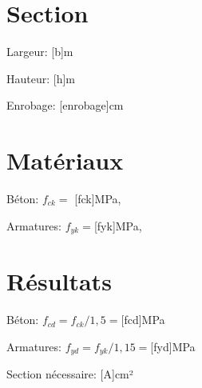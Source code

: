 


\section{Section}

Largeur: [{b}]m

Hauteur: [{h}]m

Enrobage: [{enrobage}]cm

\section{Matériaux}

Béton: $f_{ck} = $ [{fck}]MPa,

Armatures: $f_{yk} = $[{fyk}]MPa,

\section{Résultats}

Béton: $ f_{cd} = f_{ck}/ 1,5 = $[{fcd}]MPa

Armatures: $ f_{yd} = f_{yk}/ 1,15 = $[{fyd}]MPa

Section nécessaire: [{A}]cm²

